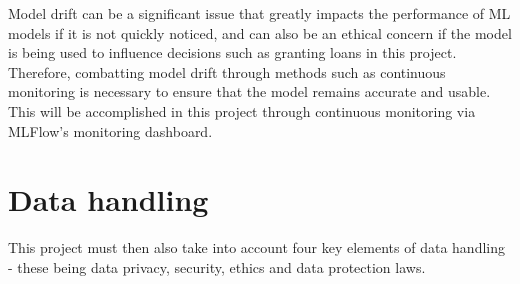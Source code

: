 \documentclass[12pt]{report}
\newcommand{\para}{\vspace{7pt}\noindent}
\begin{document}
\para Model drift can be a significant issue that greatly impacts the performance of ML models if it is not quickly noticed, and can 
also be an ethical concern if the model is being used to influence decisions such as granting loans in this project. 
Therefore, combatting model drift through methods such as continuous monitoring is necessary to ensure that the model remains accurate 
and usable. This will be accomplished in this project through continuous monitoring via MLFlow's monitoring dashboard.

\section{Data handling}
This project must then also take into account four key elements of data handling - these being data privacy, security, 
ethics and data protection laws. 
\end{document}
